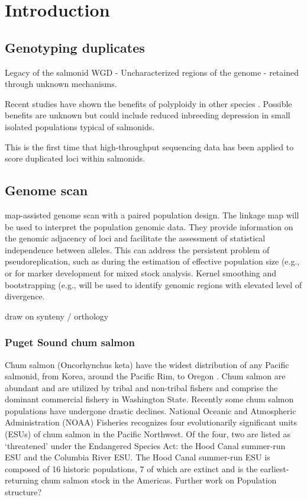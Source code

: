 \documentclass[12pt, one column]{article}
\begin{document}
\section*{Introduction}

\subsection*{Genotyping duplicates}
Legacy of the salmonid WGD - Uncharacterized regions of the genome - retained through unknown mechanisms.  

Recent studies have shown the benefits of polyploidy in other species \citep{Selmecki2015}.  Possible benefits are unknown but could include reduced inbreeding depression in small isolated populations typical of salmonids.

This is the first time that high-throughput sequencing data has been applied to score duplicated loci within salmonids.

\subsection*{Genome scan}
map-assisted genome scan with a paired population design. The linkage map will be used to interpret the population genomic data. They provide information on the genomic adjacency of loci and facilitate the  assessment of statistical independence between alleles.  This can address the persistent problem of pseudoreplication, such as during the estimation of effective population size (e.g., \citet{Larson2014} or for marker development for mixed stock analysis. Kernel smoothing and bootstrapping (e.g., \citet{Hohenlohe2010} will be used to identify genomic regions with elevated level of divergence.

draw on synteny / orthology 

\subsubsection*{Puget Sound chum salmon}

Chum salmon (Oncorhynchus keta) have the widest distribution of any Pacific salmonid, from Korea, around the Pacific Rim, to Oregon \citep{Salo1991}. Chum salmon are abundant and are utilized by tribal and non-tribal fishers and comprise the dominant commercial fishery in Washington State. Recently some chum salmon populations have undergone drastic declines.  National Oceanic and Atmospheric Administration (NOAA) Fisheries recognizes four evolutionarily significant units (ESUs) of chum salmon in the Pacific Northwest. Of the four, two are listed as ‘threatened’ under the Endangered Species Act: the Hood Canal summer-run ESU and the Columbia River ESU. The Hood Canal summer-run ESU is composed of 16 historic populations, 7 of which are extinct \citep{Good2005} and is the earliest-returning chum salmon stock in the Americas. Further work on Population structure?
\end{document}
